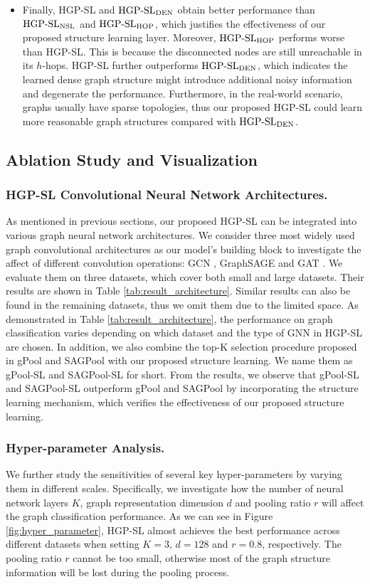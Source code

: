 \documentclass[letterpaper]{article} \usepackage{aaai20}  \usepackage{times}  \usepackage{helvet} \usepackage{courier}  \usepackage[hyphens]{url}  \usepackage{graphicx} \urlstyle{rm} \def\UrlFont{\rm}  \usepackage{graphicx}  \frenchspacing  \setlength{\pdfpagewidth}{8.5in}  \setlength{\pdfpageheight}{11in}
\begin{document}
\begin{itemize}
	\item Finally, HGP-SL and $\text{HGP-SL}_{{\rm DEN}}$ obtain better performance than $\text{HGP-SL}_{{\rm NSL}}$ and $\text{HGP-SL}_{{\rm HOP}}$, which justifies the effectiveness of our proposed structure learning layer. Moreover, $\text{HGP-SL}_{{\rm HOP}}$ performs worse than HGP-SL. This is because the disconnected nodes are still unreachable in its $h$-hops. HGP-SL further outperforms $\text{HGP-SL}_{{\rm DEN}}$, which indicates the learned dense graph structure might introduce additional noisy information and degenerate the performance. Furthermore, in the real-world scenario, graphs usually have sparse topologies, thus our proposed HGP-SL could learn more reasonable graph structures compared with $\text{HGP-SL}_{{\rm DEN}}$.
\end{itemize}

\subsection{Ablation Study and Visualization}
\subsubsection{HGP-SL Convolutional Neural Network Architectures.}
As mentioned in previous sections, our proposed HGP-SL can be integrated into various graph neural network architectures. We consider three most widely used graph convolutional architectures as our model's building block to investigate the affect of different convolution operations: GCN \cite{kipf2016semi}, GraphSAGE \cite{hamilton2017inductive} and GAT \cite{velivckovic2017graph}. We evaluate them on three datasets, which cover both small and large datasets. Their results are shown in Table \ref{tab:result_architecture}. Similar results can also be found in the remaining datasets, thus we omit them due to the limited space. As demonstrated in Table \ref{tab:result_architecture}, the performance on graph classification varies depending on which dataset and the type of GNN in HGP-SL are chosen. In addition, we also combine the top-K selection procedure proposed in gPool and SAGPool with our proposed structure learning. We name them as gPool-SL and SAGPool-SL for short. From the results, we observe that gPool-SL and SAGPool-SL outperform gPool and SAGPool by incorporating the structure learning mechanism, which verifies the effectiveness of our proposed structure learning.
\subsubsection{Hyper-parameter Analysis.}
We further study the sensitivities of several key hyper-parameters by varying them in different scales. Specifically, we investigate how the number of neural network layers $K$, graph representation dimension $d$ and pooling ratio $r$ will affect the graph classification performance. As we can see in Figure \ref{fig:hyper_parameter}, HGP-SL almost achieves the best performance across different datasets when setting $K = 3$, $d = 128$ and $r=0.8$, respectively. The pooling ratio $r$ cannot be too small, otherwise most of the graph structure information will be lost during the pooling process. 
\end{document}
